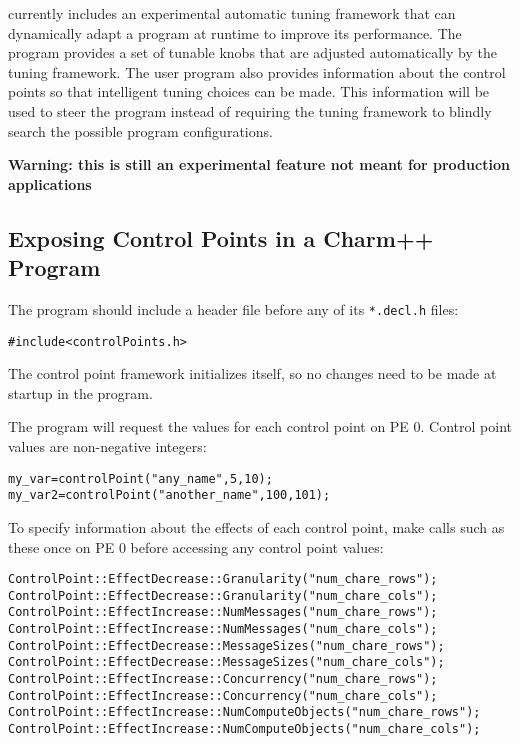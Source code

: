 \experimental{}
\charmpp{} currently includes an experimental automatic tuning
framework that can dynamically adapt a program at runtime to improve
its performance. The program provides a set of tunable knobs that are
adjusted automatically by the tuning framework. The user program also
provides information about the control points so that intelligent
tuning choices can be made. This information will be used to steer the
program instead of requiring the tuning framework to blindly search
the possible program configurations.

\textbf{Warning: this is still an experimental feature not meant for production applications}

\subsection{Exposing Control Points in a Charm++ Program}
The program should include a header file before any of its \texttt{*.decl.h} files:

\begin{alltt} 
    #include <controlPoints.h> 
\end{alltt} 

The control point framework initializes itself, so no changes need to be made at startup in the program.

The program will request the values for each control point on PE 0. Control
point values are non-negative integers:

\begin{alltt} 
    my_var = controlPoint("any_name", 5, 10);
    my_var2 = controlPoint("another_name", 100,101);
\end{alltt} 

To specify information about the effects of each control point, make calls such as these once on PE 0 before accessing any control point values:

\begin{alltt} 
    ControlPoint::EffectDecrease::Granularity("num_chare_rows");
    ControlPoint::EffectDecrease::Granularity("num_chare_cols");
    ControlPoint::EffectIncrease::NumMessages("num_chare_rows");
    ControlPoint::EffectIncrease::NumMessages("num_chare_cols");
    ControlPoint::EffectDecrease::MessageSizes("num_chare_rows");
    ControlPoint::EffectDecrease::MessageSizes("num_chare_cols");
    ControlPoint::EffectIncrease::Concurrency("num_chare_rows");
    ControlPoint::EffectIncrease::Concurrency("num_chare_cols");
    ControlPoint::EffectIncrease::NumComputeObjects("num_chare_rows");
    ControlPoint::EffectIncrease::NumComputeObjects("num_chare_cols");
\end{alltt} 

